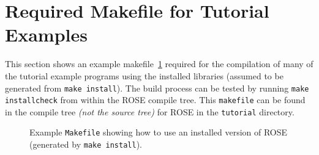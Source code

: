 
\section{Required Makefile for Tutorial Examples}
\label{TutorialMakefiles}


    This section shows an example makefile~\ref{Tutorial:exampleMakefile} 
required for the compilation of many of the tutorial example programs 
using the installed libraries (assumed to be generated from {\tt make install}).
The build process can be tested by running {\tt make installcheck} from within 
the ROSE compile tree.  This {\tt makefile} can be found in the compile tree
{\em (not the source tree)} for ROSE in the {\tt tutorial} directory.

\begin{figure}[!h]
{\indent
{\mySmallFontSize

\begin{latexonly}
%  
%  
\end{latexonly}

\begin{htmlonly}
   
\end{htmlonly}

}
}
\caption{Example {\tt Makefile} showing how to use an installed version of ROSE (generated by {\tt make install}).}
\label{Tutorial:exampleMakefile}
\end{figure}

